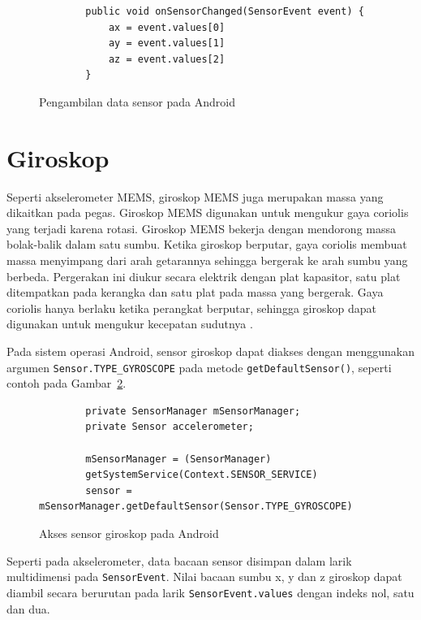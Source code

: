 \begin{figure}[h]
    \begin{verbatim}
        public void onSensorChanged(SensorEvent event) {
            ax = event.values[0]
            ay = event.values[1]
            az = event.values[2]
        }
    \end{verbatim}
    \caption{Pengambilan data sensor pada Android}
    \label{listing:teori-pengambilan-data-sensor}
\end{figure}



\section{Giroskop}
Seperti akselerometer MEMS, giroskop MEMS juga merupakan massa yang dikaitkan pada pegas. Giroskop MEMS digunakan untuk mengukur gaya coriolis yang terjadi karena rotasi. Giroskop MEMS bekerja dengan mendorong massa bolak-balik dalam satu sumbu. Ketika giroskop berputar, gaya coriolis membuat massa menyimpang dari arah getarannya sehingga bergerak ke arah sumbu yang berbeda. Pergerakan ini diukur secara elektrik dengan plat kapasitor, satu plat ditempatkan pada kerangka dan satu plat pada massa yang bergerak. Gaya coriolis hanya berlaku ketika perangkat berputar, sehingga giroskop dapat digunakan untuk mengukur kecepatan sudutnya \Parencite{milette-2012}.

Pada sistem operasi Android, sensor giroskop dapat diakses dengan menggunakan argumen \texttt{Sensor.TYPE_GYROSCOPE} pada metode \texttt{getDefaultSensor()}, seperti contoh pada Gambar~\ref{listing:teori-akses-giroskop}.

\begin{figure}[h]
    \begin{verbatim}
        private SensorManager mSensorManager;
        private Sensor accelerometer;

        mSensorManager = (SensorManager)
        getSystemService(Context.SENSOR_SERVICE)
        sensor = mSensorManager.getDefaultSensor(Sensor.TYPE_GYROSCOPE)
    \end{verbatim}
    \caption{Akses sensor giroskop pada Android}
    \label{listing:teori-akses-giroskop}
\end{figure}

Seperti pada akselerometer, data bacaan sensor disimpan dalam larik multidimensi pada \texttt{SensorEvent}. Nilai bacaan sumbu x, y dan z giroskop dapat diambil secara berurutan pada larik \texttt{SensorEvent.values} dengan indeks nol, satu dan dua.


